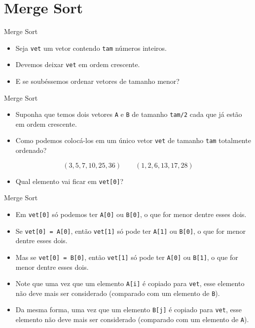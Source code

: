 \documentclass[handout]{beamer}
\newcommand{\cod}[1]{\texttt{#1}}
\begin{document}
\section{Merge Sort}

\begin{frame}[fragile]{Merge Sort}

    \begin{itemize}
        \item Seja \cod{vet} um vetor contendo \cod{tam} números inteiros.
        \item Devemos deixar \cod{vet} em ordem crescente.
        \item E se soubéssemos ordenar vetores de tamanho menor?
    \end{itemize}

\end{frame}

\begin{frame}[fragile]{Merge Sort}

    \begin{itemize}
        \item Suponha que temos dois vetores \cod{A} e \cod{B} de tamanho \cod{tam/2} cada que já estão em ordem crescente.
        \item Como podemos colocá-los em um único vetor \cod{vet} de tamanho \cod{tam} totalmente ordenado?
    \end{itemize}

    $$(3,5,7,10,25,36) \qquad (1,2,6,13,17,28)$$

    \begin{itemize}
        \item Qual elemento vai ficar em \cod{vet[0]}?
    \end{itemize}

\end{frame}

\begin{frame}[fragile]{Merge Sort}
    
    \begin{itemize}
        \item Em \cod{vet[0]} só podemos ter \cod{A[0]} ou \cod{B[0]}, o que for menor dentre esses dois.
        \item Se \cod{vet[0] = A[0]}, então \cod{vet[1]} só pode ter \cod{A[1]} ou \cod{B[0]}, o que for menor dentre esses dois.
        \item Mas se \cod{vet[0] = B[0]}, então \cod{vet[1]} só pode ter \cod{A[0]} ou \cod{B[1]}, o que for menor dentre esses dois.
        \item Note que uma vez que um elemento \cod{A[i]} é copiado para \cod{vet}, esse elemento não deve mais ser considerado (comparado com um elemento de \cod{B}).
        \item Da mesma forma, uma vez que um elemento \cod{B[j]} é copiado para \cod{vet}, esse elemento não deve mais ser considerado (comparado com um elemento de \cod{A}).
    \end{itemize}

\end{frame}
\end{document}
